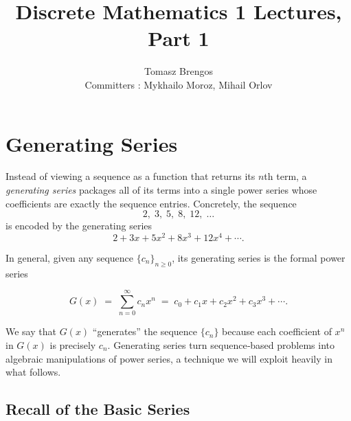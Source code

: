 \documentclass{article}
\title{Discrete Mathematics 1 Lectures, Part 1}
\author{Tomasz Brengos \\  
Committers : Mykhailo Moroz, Mihail Orlov}
\date{}
\begin{document}
\maketitle
\section{Generating Series}

Instead of viewing a sequence as a function that returns its \(n\)th term, a \emph{generating series} packages all of its terms into a single power series whose coefficients are exactly the sequence entries.  Concretely, the sequence
\[
2,\;3,\;5,\;8,\;12,\;\dots
\]
is encoded by the generating series
\[
2 + 3x + 5x^2 + 8x^3 + 12x^4 + \cdots.
\]

In general, given any sequence \(\{c_n\}_{n\ge0}\), its generating series is the formal power series

\[
G(x) \;=\; \sum_{n=0}^\infty c_n x^n 
\;=\;
c_0 + c_1 x + c_2 x^2 + c_3 x^3 + \cdots.
\]

We say that \(G(x)\) “generates” the sequence \(\{c_n\}\) because each coefficient of \(x^n\) in \(G(x)\) is precisely \(c_n\).  Generating series turn sequence‑based problems into algebraic manipulations of power series, a technique we will exploit heavily in what follows.

\subsection*{Recall of the Basic Series}
\end{document}
